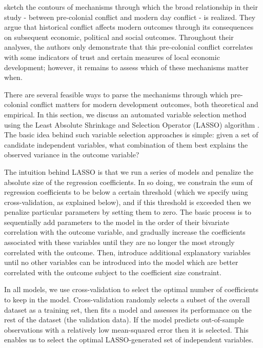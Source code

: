 \citet{BesleyRQ2014} sketch the contours of mechanisms through which the broad relationship in their study - between pre-colonial conflict and modern day conflict - is realized. They argue that historical conflict affects modern outcomes through its consequences on subsequent economic, political and social outcomes. Throughout their analyses, the authors only demonstrate that this pre-colonial conflict correlates with some indicators of trust and certain measures of local economic development; however, it remains to assess which of these mechanisms matter when. 

There are several feasible ways to parse the mechanisms through which pre-colonial conflict matters for modern development outcomes, both theoretical and empirical. In this section, we discuss an automated variable selection method using the Least Absolute Shrinkage and Selection Operator (LASSO) algorithm \citep{tibshirani1996regression}. The basic idea behind such variable selection approaches is simple: given a set of candidate independent variables, what combination of them best explains the observed variance in the outcome variable?

The intuition behind LASSO is that we run a series of models and penalize the absolute size of the regression coefficients. In so doing, we constrain the sum of regression coefficients to be below a certain threshold (which we specify using cross-validation, as explained below), and if this threshold is exceeded then we penalize particular parameters by setting them to zero. The basic process is to sequentially add parameters to the model in the order of their bivariate correlation with the outcome variable, and gradually increase the coefficients associated with these variables until they are no longer the most strongly correlated with the outcome. Then, introduce additional explanatory variables until no other variables can be introduced into the model which are better correlated with the outcome subject to the coefficient size constraint. 

In all models, we use cross-validation to select the optimal number of coefficients to keep in the model. Cross-validation randomly selects a subset of the overall dataset as a training set, then fits a model and assesses its performance on the rest of the dataset (the validation data). If the model predicts out-of-sample observations with a relatively low mean-squared error then it is selected. This enables us to select the optimal LASSO-generated set of independent variables.

